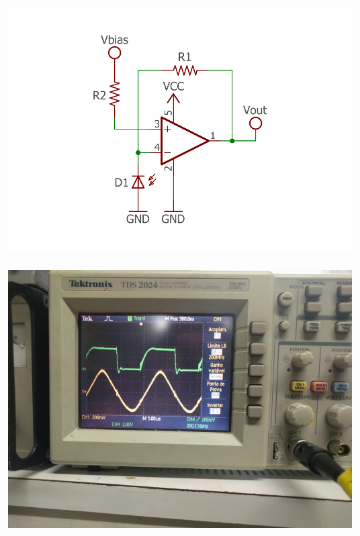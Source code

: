 	\begin{figure}[htb]
		\caption{\label{fig_transimpedance_amp_complex_outer}Circuito e saída de um amplificador de impedâncias. No circuito, o fotodiodo é reversamente polarizado por $V_{bias}$. No osciloscópio, a saída está marcada em amarelo enquanto a saída do LED está em verde.}
		\begin{subfigure}{.5\textwidth}
			\centering
			\includegraphics[width=1\textwidth, trim={1cm 1cm 1cm 2cm}, clip]{circuits/transimpedance_amp.pdf}
		\end{subfigure}
		\begin{subfigure}{.5\textwidth}
			\centering
			\includegraphics[width=1\textwidth, trim={25cm 35cm 40cm 15cm}, clip]{circuits/photos/RX_TIA_result.jpg}
		\end{subfigure}
	\end{figure}


